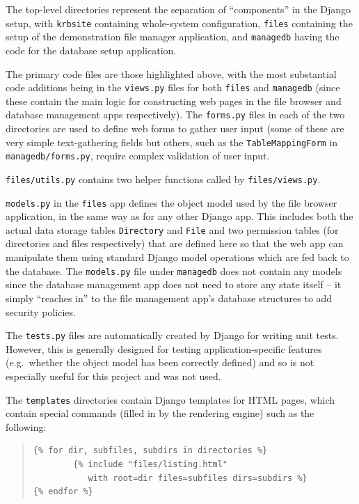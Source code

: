 \documentclass[12pt]{report}
\begin{document}
The top-level directories represent the separation of ``components'' in the Django setup, with \texttt{krbsite} containing whole-system configuration, \texttt{files} containing the setup of the demonstration file manager application, and \texttt{managedb} having the code for the database setup application.

The primary code files are those highlighted above, with the most substantial code additions being in the \texttt{views.py} files for both \texttt{files} and \texttt{managedb} (since these contain the main logic for constructing web pages in the file browser and database management apps respectively). The \texttt{forms.py} files in each of the two directories are used to define web forms to gather user input (some of these are very simple text-gathering fields but others, such as the \texttt{TableMappingForm} in \texttt{managedb/forms.py}, require complex validation of user input.

\texttt{files/utils.py} contains two helper functions called by \texttt{files/views.py}.

\texttt{models.py} in the \texttt{files} app defines the object model used by the file browser application, in the same way as for any other Django app. This includes both the actual data storage tables \texttt{Directory} and \texttt{File} and two permission tables (for directories and files respectively) that are defined here so that the web app can manipulate them using standard Django model operations which are fed back to the database. The \texttt{models.py} file under \texttt{managedb} does not contain any models since the database management app does not need to store any state itself -- it simply ``reaches in'' to the file management app's database structures to add security policies.

The \texttt{tests.py} files are automatically created by Django for writing unit tests. However, this is generally designed for testing application-specific features (e.g.\ whether the object model has been correctly defined) and so is not especially useful for this project and was not used.

The \texttt{templates} directories contain Django templates for HTML pages, which contain special commands (filled in by the rendering engine) such as the following:

\begin{quote}
\begin{verbatim}
{% for dir, subfiles, subdirs in directories %}
        {% include "files/listing.html"
           with root=dir files=subfiles dirs=subdirs %}
{% endfor %}
\end{verbatim}
\end{quote}
\end{document}

